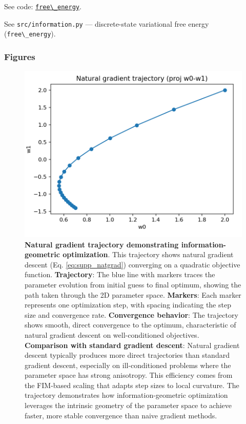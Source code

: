 \documentclass[
  10pt,
]{article}
\newcommand{\passthrough}[1]{#1}
\begin{document}
See code:
\href{03_quadray_methods.md\#code:free_energy}{\passthrough{\lstinline!free\_energy!}}.

See \passthrough{\lstinline!src/information.py!} --- discrete-state
variational free energy (\passthrough{\lstinline!free\_energy!}).

\hypertarget{figures-2}{%
\subsubsection{Figures}\label{figures-2}}

\begin{figure}
\centering
\includegraphics{../output/figures/natural_gradient_path.png}
\caption{\textbf{Natural gradient trajectory demonstrating
information-geometric optimization}. This trajectory shows natural
gradient descent (Eq. \ref{eq:supp_natgrad}) converging on a quadratic
objective function. \textbf{Trajectory}: The blue line with markers
traces the parameter evolution from initial guess to final optimum,
showing the path taken through the 2D parameter space. \textbf{Markers}:
Each marker represents one optimization step, with spacing indicating
the step size and convergence rate. \textbf{Convergence behavior}: The
trajectory shows smooth, direct convergence to the optimum,
characteristic of natural gradient descent on well-conditioned
objectives. \textbf{Comparison with standard gradient descent}: Natural
gradient descent typically produces more direct trajectories than
standard gradient descent, especially on ill-conditioned problems where
the parameter space has strong anisotropy. This efficiency comes from
the FIM-based scaling that adapts step sizes to local curvature. The
trajectory demonstrates how information-geometric optimization leverages
the intrinsic geometry of the parameter space to achieve faster, more
stable convergence than naive gradient methods.}
\end{figure}
\end{document}
